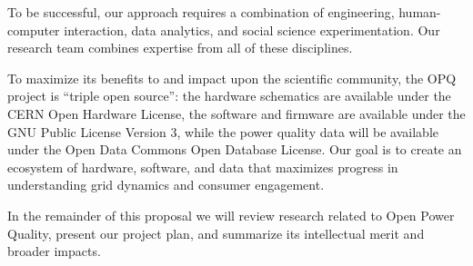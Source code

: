 To be successful, our approach requires a combination of engineering, human-computer interaction, data analytics, and social science experimentation.  Our research team combines expertise from all of these disciplines. 

To maximize its benefits to and impact upon the scientific community, the OPQ project is ``triple open source'': the hardware schematics are available under the CERN Open Hardware License, the software and firmware are available under the GNU Public License Version 3, while the power quality data will be available under the Open Data Commons Open Database License.  Our goal is to create an ecosystem of hardware, software, and data that maximizes progress in understanding grid dynamics and consumer engagement.


In the remainder of this proposal we will review research related to Open Power Quality, present our project plan, and summarize its intellectual merit and broader impacts.



 

